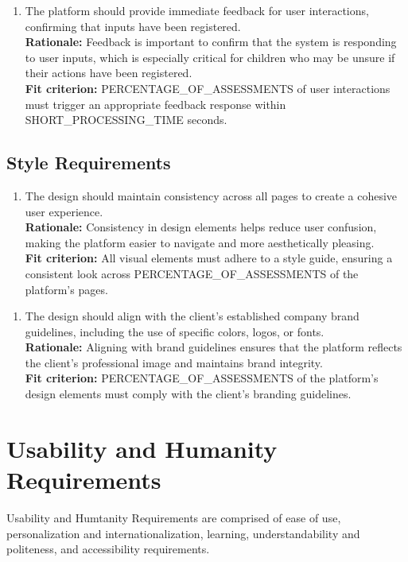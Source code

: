 \documentclass[12pt]{article}
\begin{document}
\begin{enumerate}[label={LF-AR}5. ]
  \item The platform should provide immediate feedback for user interactions, confirming that inputs have been registered.\\
  \textbf{Rationale: }Feedback is important to confirm that the system is responding to user inputs, which is especially critical for children who may be unsure if their actions have been registered.\\
  \textbf{Fit criterion: }PERCENTAGE\_OF\_ASSESSMENTS of user interactions must trigger an appropriate feedback response within\\ SHORT\_PROCESSING\_TIME seconds.  
\end{enumerate}

\subsection{Style Requirements}
\begin{enumerate}[label={LF-SR}1. ]
  \item The design should maintain consistency across all pages to create a cohesive user experience.\\
  \textbf{Rationale: }Consistency in design elements helps reduce user confusion, making the platform easier to navigate and more aesthetically pleasing.\\
  \textbf{Fit criterion: }All visual elements must adhere to a style guide, ensuring a consistent look across PERCENTAGE\_OF\_ASSESSMENTS of the platform’s pages.  
\end{enumerate}
\begin{enumerate}[label={LF-SR}2. ]
  \item The design should align with the client's established company brand guidelines, including the use of specific colors, logos, or fonts.\\
  \textbf{Rationale: }Aligning with brand guidelines ensures that the platform reflects the client's professional image and maintains brand integrity.\\
  \textbf{Fit criterion: }PERCENTAGE\_OF\_ASSESSMENTS of the platform’s design elements must comply with the client’s branding guidelines.  
\end{enumerate}

\newpage

\section{Usability and Humanity Requirements}
\hspace{2em}Usability and Humtanity Requirements are comprised of ease of use, personalization and internationalization, learning, understandability and politeness, and accessibility requirements.
\end{document}
